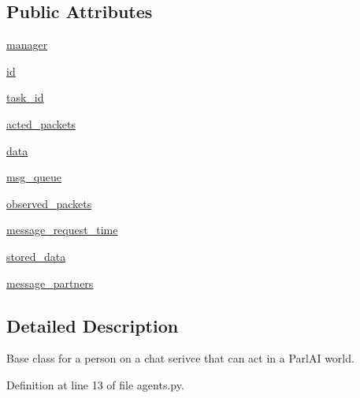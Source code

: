 \subsection*{Public Attributes}
\begin{DoxyCompactItemize}
\item 
\hyperlink{classparlai_1_1chat__service_1_1core_1_1agents_1_1ChatServiceAgent_a8216a688db46e2aa7cdd023016ecf27c}{manager}
\item 
\hyperlink{classparlai_1_1chat__service_1_1core_1_1agents_1_1ChatServiceAgent_abb09786f0faf1d21a0521dd105f35c40}{id}
\item 
\hyperlink{classparlai_1_1chat__service_1_1core_1_1agents_1_1ChatServiceAgent_a1f1f978765ae81ca5ec8d04d14575386}{task\+\_\+id}
\item 
\hyperlink{classparlai_1_1chat__service_1_1core_1_1agents_1_1ChatServiceAgent_ac394b3601eb7039d5fb43c38795bbf49}{acted\+\_\+packets}
\item 
\hyperlink{classparlai_1_1chat__service_1_1core_1_1agents_1_1ChatServiceAgent_a6e02c9025ec3cf0ba64c58896ff97cc6}{data}
\item 
\hyperlink{classparlai_1_1chat__service_1_1core_1_1agents_1_1ChatServiceAgent_ae7b1e47cce1528d7f6836a0a6875e43a}{msg\+\_\+queue}
\item 
\hyperlink{classparlai_1_1chat__service_1_1core_1_1agents_1_1ChatServiceAgent_acb729e7d0bce867d891d15c08a3704fc}{observed\+\_\+packets}
\item 
\hyperlink{classparlai_1_1chat__service_1_1core_1_1agents_1_1ChatServiceAgent_a559242012ccef00ab3b2f9393cf67da6}{message\+\_\+request\+\_\+time}
\item 
\hyperlink{classparlai_1_1chat__service_1_1core_1_1agents_1_1ChatServiceAgent_a62cf09938c47f55c204637e56d089167}{stored\+\_\+data}
\item 
\hyperlink{classparlai_1_1chat__service_1_1core_1_1agents_1_1ChatServiceAgent_a0ed0cd7392d1925ac8643c2280eaffb4}{message\+\_\+partners}
\end{DoxyCompactItemize}


\subsection{Detailed Description}
\begin{DoxyVerb}Base class for a person on a chat serivce that can act in a ParlAI world.
\end{DoxyVerb}
 

Definition at line 13 of file agents.\+py.




